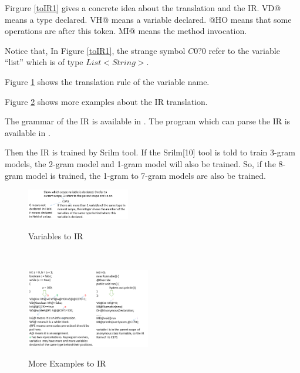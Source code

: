 \documentclass{sig-alternate-05-2015}
\begin{document}
Firgure \ref{toIR1} gives a concrete idea about the translation and the IR. VD@ means a type declared. VH@ means a variable declared.
@HO means that some operations are after this token. MI@ means the method invocation.

Notice that, In Figure \ref{toIR1}, the strange symbol $C0?0$ refer to the variable ``list'' which is of type $List<String>$.

Figure \ref{vartoIR1} shows the translation rule of the variable name.

Figure \ref{moretoIR} shows more examples about the IR translation.


The grammar of the IR is available in \cite{irgrammar}. The program which can parse the IR is available in \cite{irparser}.

Then the IR is trained by Srilm\cite{stolcke2011srilm} tool. If the Srilm[10]
tool is told to train 3-gram models, the 2-gram model and 1-gram model will also be trained. So, if the 8-gram model is trained, the 1-gram to 7-gram models are also be trained.
\vspace{-0.4cm}
\\\begin{figure}[htbp]
  \centering
  \includegraphics[width=0.4\textwidth]{pics/variableIR.png}\\
  \vspace{-0.1cm}
  \caption{Variables to IR}\label{vartoIR1}
\end{figure}
\vspace{-0.4cm}
\\\begin{figure}[htbp]
  \centering
  \includegraphics[width=0.48\textwidth]{pics/moreexamplesIR.png}\\
  \vspace{-0.1cm}
  \caption{More Examples to IR}\label{moretoIR}
\end{figure}
\end{document}
